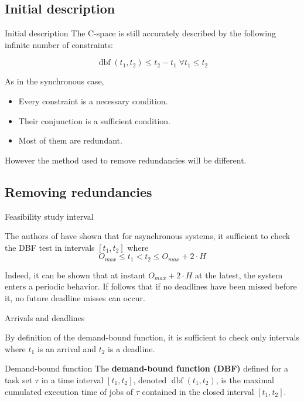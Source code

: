 \documentclass{beamer}
\newcommand{\dbf}[1]{\operatorname{dbf}(#1)}
\begin{document}
    \subsection{Initial description}

	\begin{frame}{Initial description}
		The C-space is still accurately described by the following infinite number of constraints:

        $$\dbf{t_1, t_2} \leq t_2 - t_1 \; \forall t_1 \leqslant  t_2$$

        As in the synchronous case,
        \begin{itemize}
            \item Every constraint is a necessary condition.
            \item Their conjunction is a sufficient condition.
            \item Most of them are redundant.
        \end{itemize}
        However the method used to remove redundancies will be different.
	\end{frame}

    \subsection{Removing redundancies}

    \begin{frame}{Feasibility study interval}

        The authors of \cite{leung1982complexity} have shown that for asynchronous systems, it sufficient to check the DBF test in intervals $[t_1, t_2]$ where $$O_{max} \leqslant t_1 < t_2 \leqslant O_{max} + 2 \cdot H$$

        Indeed, it can be shown that at instant $O_{max} + 2 \cdot H$ at the latest, the system enters a periodic behavior. If follows that if no deadlines have been missed before it, no future deadline misses can occur.

    \end{frame}

    \begin{frame}{Arrivals and deadlines}

        By definition of the demand-bound function, it is sufficient to check only intervals where $t_1$ is an arrival and $t_2$ is a deadline.

        \begin{block}{Demand-bound function}
            The \textbf{demand-bound function (DBF)}
            defined for a task set $\tau$ in a time interval $[t_1, t_2]$, denoted $\dbf{t_1, t_2}$, is
            the maximal cumulated execution time of jobs of $\tau$ contained in the
            closed interval $[t_1, t_2]$.
        \end{block}

    \end{frame}
\end{document}
